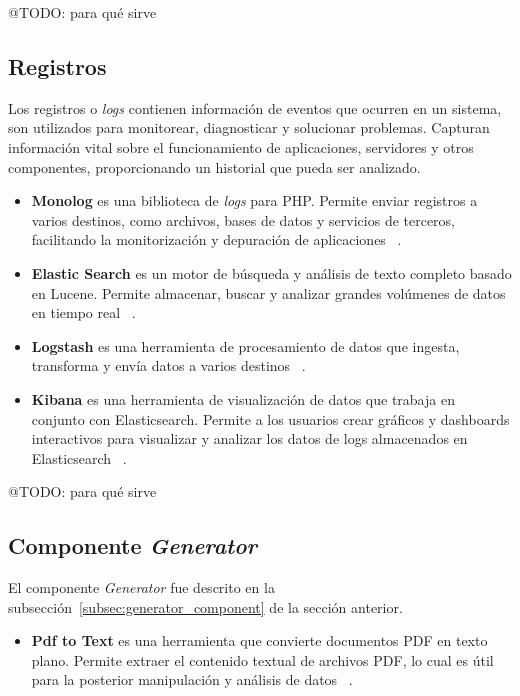 \colorbox{color_highlight}{@TODO: para qué sirve}

\subsection*{Registros}
Los registros o \textit{logs} contienen información de eventos que ocurren en un sistema, son utilizados para
monitorear, diagnosticar y solucionar problemas.
Capturan información vital sobre el funcionamiento de aplicaciones, servidores y otros componentes, proporcionando un
historial que pueda ser analizado.

\begin{itemize}
    \item \textbf{Monolog} es una biblioteca de \textit{logs} para PHP. Permite enviar registros a varios destinos, como
    archivos, bases de datos y servicios de terceros, facilitando la monitorización y depuración de aplicaciones
    ~\cite{https://github.com/Seldaek/monolog}.
    \item \textbf{Elastic Search} es un motor de búsqueda y análisis de texto completo basado en Lucene.
    Permite almacenar, buscar y analizar grandes volúmenes de datos en tiempo real
    ~\cite{https://www.elastic.co/guide/en/elasticsearch/reference/current/index.html}.
    \item \textbf{Logstash} es una herramienta de procesamiento de datos que ingesta, transforma y envía datos a varios
    destinos ~\cite{https://www.elastic.co/guide/en/logstash/current/index.html}.
    \item \textbf{Kibana} es una herramienta de visualización de datos que trabaja en conjunto con Elasticsearch.
    Permite a los usuarios crear gráficos y dashboards interactivos para visualizar y analizar los datos de logs
    almacenados en Elasticsearch ~\cite{https://www.elastic.co/guide/en/kibana/current/index.html}.
\end{itemize}

\colorbox{color_highlight}{@TODO: para qué sirve}

\subsection*{Componente \textit{Generator}}

El componente \textit{Generator} fue descrito en la subsección~\ref{subsec:generator_component} de la sección anterior.

\begin{itemize}
    \item \textbf{Pdf to Text} es una herramienta que convierte documentos PDF en texto plano.
    Permite extraer el contenido textual de archivos PDF, lo cual es útil para la posterior manipulación y análisis de
    datos ~\cite{https://www.xpdfreader.com/pdftotext-man.html}.
\end{itemize}

